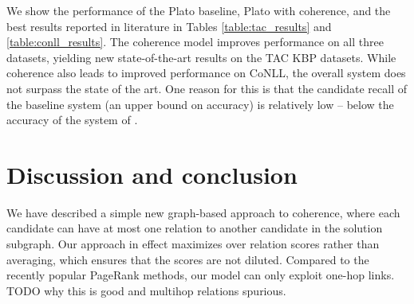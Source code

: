 \documentclass[11pt,letterpaper]{article}
\begin{document}
We show the performance of the Plato baseline, Plato with coherence, and the best results reported in literature in Tables \ref{table:tac_results} and \ref{table:conll_results}.  The coherence model improves performance on all three datasets, yielding new state-of-the-art results on the TAC KBP datasets. While coherence also leads to improved performance on CoNLL, the overall system does not surpass the state of the art. One reason for this is that the candidate recall of the baseline system (an upper bound on accuracy) is relatively low -- below the accuracy of the system of \cite{Pershina2015}. 

\section{Discussion and conclusion}

We have described a simple new graph-based approach to coherence, where each candidate can have at most one relation to another candidate in the solution subgraph. Our approach in effect maximizes over relation scores rather than averaging, which ensures that the scores are not diluted. Compared to the recently popular PageRank methods, our model can only exploit one-hop links. TODO why this is good and multihop relations spurious.





\end{document}
